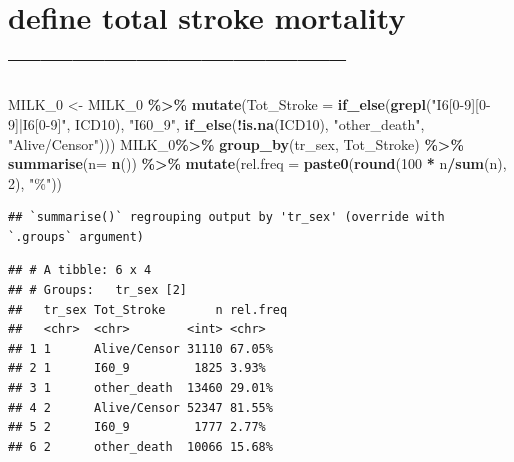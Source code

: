 \documentclass[
]{article}
\newenvironment{Shaded}{\begin{snugshade}}{\end{snugshade}}
\newcommand{\DataTypeTok}[1]{\textcolor[rgb]{0.13,0.29,0.53}{#1}}
\newcommand{\DecValTok}[1]{\textcolor[rgb]{0.00,0.00,0.81}{#1}}
\newcommand{\KeywordTok}[1]{\textcolor[rgb]{0.13,0.29,0.53}{\textbf{#1}}}
\newcommand{\NormalTok}[1]{#1}
\newcommand{\OperatorTok}[1]{\textcolor[rgb]{0.81,0.36,0.00}{\textbf{#1}}}
\newcommand{\StringTok}[1]{\textcolor[rgb]{0.31,0.60,0.02}{#1}}
\begin{document}
\hypertarget{define-total-stroke-mortality}{%
\section{define total stroke mortality
--------------------------------}\label{define-total-stroke-mortality}}

\begin{Shaded}
\begin{Highlighting}[]
\NormalTok{MILK\_}\DecValTok{0}\NormalTok{ \textless{}{-}}\StringTok{ }\NormalTok{MILK\_}\DecValTok{0} \OperatorTok{\%\textgreater{}\%}\StringTok{ }
\StringTok{  }\KeywordTok{mutate}\NormalTok{(}\DataTypeTok{Tot\_Stroke =} \KeywordTok{if\_else}\NormalTok{(}\KeywordTok{grepl}\NormalTok{(}\StringTok{"I6[0{-}9][0{-}9]|I6[0{-}9]"}\NormalTok{,  }
\NormalTok{                                    ICD10), }\StringTok{"I60\_9"}\NormalTok{, }
                        \KeywordTok{if\_else}\NormalTok{(}\OperatorTok{!}\KeywordTok{is.na}\NormalTok{(ICD10), }\StringTok{"other\_death"}\NormalTok{, }
                                      \StringTok{"Alive/Censor"}\NormalTok{))) }
\NormalTok{MILK\_}\DecValTok{0}\OperatorTok{\%\textgreater{}\%}\StringTok{ }
\StringTok{  }\KeywordTok{group\_by}\NormalTok{(tr\_sex, Tot\_Stroke) }\OperatorTok{\%\textgreater{}\%}
\StringTok{  }\KeywordTok{summarise}\NormalTok{(}\DataTypeTok{n=} \KeywordTok{n}\NormalTok{()) }\OperatorTok{\%\textgreater{}\%}
\StringTok{  }\KeywordTok{mutate}\NormalTok{(}\DataTypeTok{rel.freq =} \KeywordTok{paste0}\NormalTok{(}\KeywordTok{round}\NormalTok{(}\DecValTok{100} \OperatorTok{*}\StringTok{ }\NormalTok{n}\OperatorTok{/}\KeywordTok{sum}\NormalTok{(n), }\DecValTok{2}\NormalTok{), }\StringTok{"\%"}\NormalTok{))}
\end{Highlighting}
\end{Shaded}

\begin{verbatim}
## `summarise()` regrouping output by 'tr_sex' (override with `.groups` argument)
\end{verbatim}

\begin{verbatim}
## # A tibble: 6 x 4
## # Groups:   tr_sex [2]
##   tr_sex Tot_Stroke       n rel.freq
##   <chr>  <chr>        <int> <chr>   
## 1 1      Alive/Censor 31110 67.05%  
## 2 1      I60_9         1825 3.93%   
## 3 1      other_death  13460 29.01%  
## 4 2      Alive/Censor 52347 81.55%  
## 5 2      I60_9         1777 2.77%   
## 6 2      other_death  10066 15.68%
\end{verbatim}
\end{document}

